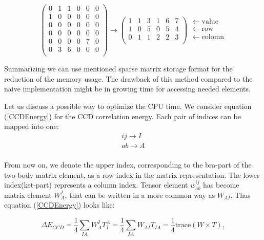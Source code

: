 \documentclass[twoside,english]{uiofysmaster}
\begin{document}
\[
\begin{pmatrix} 

 0 & 1 & 1 & 0 & 0 & 0 \\
 1 & 0 & 0 & 0 & 0 & 0 \\
 0 & 0 & 0 & 0 & 0 & 0\\
 0 & 0 & 0 & 0 & 0 & 0\\
 0 & 0 & 0 & 0 & 7 & 0\\
 0 & 3 & 6 & 0 & 0 & 0 \\
\end{pmatrix} \rightarrow
\begin{pmatrix} 
1 & 1 & 3 & 1 & 6 & 7 \\
1 & 0 & 5 & 0 & 5 & 4 \\
0 & 1 & 1 & 2 & 2 & 3 \\
\end{pmatrix}
\begin{matrix} 
\leftarrow \mathrm{value} \\
\leftarrow \mathrm{row}\\
\leftarrow \mathrm{colomn}\\
\end{matrix}
\]

Summarizing we can use mentioned sparse matrix storage format for the reduction of the memory usage. The drawback of this method compared to the naive implementation might be in growing time for accessing needed elements.

Let us discuss a possible way to optimize the CPU time. We consider equation (\ref{CCDEnergy}) for the CCD correlation energy. Each pair of indices can be mapped into one:
\[
\begin{matrix} 
ij \rightarrow I \\
ab \rightarrow A \\
\end{matrix} 
\]

From now on, we denote the upper index, corresponding to the bra-part of the two-body matrix element, as a row index in the matrix representation. The lower index(ket-part) represents a column index. Tensor element $w_{ab}^{ij}$ has become matrix element $W_{A}^{I}$, that can be written in a more common way as $W_{AI}$.
Thus equation (\ref{CCDEnergy}) looks like:

\begin{equation}
\Delta E_{CCD} = \frac{1}{4} \sum_{IA} W_{A}^{I} T_{I}^{A} = \frac{1}{4} \sum_{IA} W_{AI} T_{IA} = \frac{1}{4} \text{trace}(W\times T),
\end{equation}
\end{document}
